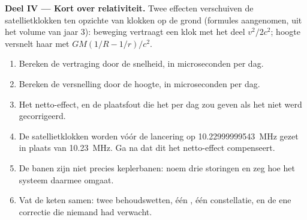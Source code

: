 \begin{problem}
\medskip
\noindent\textbf{Deel IV --- Kort over relativiteit.}
Twee effecten verschuiven de satellietklokken ten opzichte van klokken op de
grond (formules aangenomen, uit het volume van jaar 3): beweging vertraagt een
klok met het deel $v^2/2c^2$; hoogte versnelt haar met $GM(1/R - 1/r)/c^2$.
\begin{enumerate}[resume]
  \item Bereken de vertraging door de snelheid, in microseconden per dag.
  \item Bereken de versnelling door de hoogte, in microseconden per
        dag.
  \item Het netto-effect, en de plaatsfout die het per dag zou geven als het
        niet werd gecorrigeerd.
  \item De satellietklokken worden vóór de lancering op
        \qty{10.22999999543}{MHz} gezet in plaats van \qty{10.23}{MHz}. Ga na
        dat dit het netto-effect compenseert.
  \item De banen zijn niet precies keplerbanen: noem drie storingen
        en zeg hoe het systeem daarmee omgaat.
  \item Vat de keten samen: twee behoudswetten, één , één
        constellatie, en de ene correctie die niemand had verwacht.
\end{enumerate}
\end{problem}
